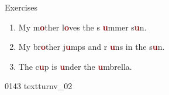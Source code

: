 \documentclass[aspectratio=169, xcolor={dvipsnames,table}]{beamer}
\begin{document}
\begin{frame}[plain]{Exercises }
  \LARGE

  \begin{enumerate}
    \item My m\textcolor{Maroon}{\bfseries o}ther l\textcolor{Maroon}{\bfseries o}ves the s\textcolor{Maroon}{\bfseries
            u}mmer s\textcolor{Maroon}{\bfseries u}n.

    \item My br\textcolor{Maroon}{\bfseries o}ther j\textcolor{Maroon}{\bfseries u}mps and r\textcolor{Maroon}{\bfseries
            u}ns in the s\textcolor{Maroon}{\bfseries u}n.

    \item The c\textcolor{Maroon}{\bfseries u}p is \textcolor{Maroon}{\bfseries u}nder the
          \textcolor{Maroon}{\bfseries u}mbrella.
  \end{enumerate}

  \hfill\tiny{0143}\,{\scriptsize {}\,{\tiny textturnv\_02}}
\end{frame}
\end{document}
